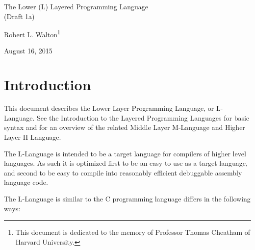 \documentclass[12pt]{article}
\makeatletter
\renewcommand\tableofcontents{%
    \begin{list}{}%
	     {\setlength{\itemsep}{0in}%
	      \setlength{\topsep}{0in}%
	      \setlength{\parsep}{1ex}%
	      \setlength{\labelwidth}{0in}%
	      \setlength{\baselineskip}{1.5ex}%
	      \setlength{\leftmargin}{1.0in}%
	      \setlength{\rightmargin}{1.0in}}%
    \item\@starttoc{toc}%
    \end{list}}
\makeatother
\begin{document}
        
\begin{center}

{\Large
The Lower (L) Layered Programming Language \\[0.5ex]
(Draft 1a)}

\medskip

Robert L. Walton\footnote{This document is dedicated to the memory
of Professor Thomas Cheatham of Harvard University.}

August 16, 2015
 
\end{center}

{\small \tableofcontents}

\newpage

\section{Introduction}

This document describes the Lower Layer Programming Language, or
L-Language.  See the Introduction to the Layered
Programming Languages for basic syntax and for an overview of the related
Middle Layer M-Language and Higher Layer H-Language.

The L-Language is intended to be a target language for compilers of
higher level languages.  As such it is optimized first to be an easy to 
use as a target language, and second to be easy to
compile into reasonably efficient debuggable assembly language code.

The L-Language is similar to the C programming language
differs in the following ways:
\end{document}
